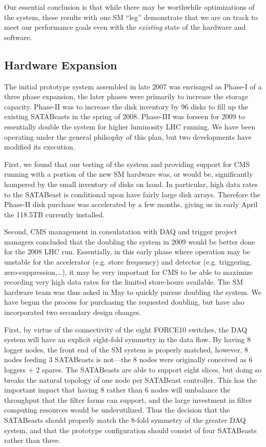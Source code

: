 Our essential conclusion is that while there may be worthwhile optimizations 
of the system, these results with one SM ``leg'' demonstrate that we are on track
to meet our performance goals even with the {\it existing}
state of the hardware and software.


\subsection{Hardware Expansion\label{sec:SMexpansion}}

The initial prototype system assembled in late 2007 was envisaged as Phase-I 
of a three phase expansion, the later phases were primarily to increase the
storage capacity.
Phase-II was to increase the disk inventory by 96 disks to fill up the existing
SATABeasts in the spring of 2008.
Phase-III was forseen for 2009 to essentially double the system for higher 
luminosity LHC running.
We have been operating under the general philsophy of this plan, 
but two developments have modified its execution.

First, we found that our testing of the system and providing support for CMS
running with a portion of the new SM hardware was, or would be, significantly hampered 
by the small inventory of disks on hand.
In particular, high data rates to the SATABeast is conditional upon have
fairly large disk arrays.
Therefore the Phase-II disk purchase was accelerated by a few months,
giving us in early April the 118.5TB currently installed.

Second, CMS management in consulatation with DAQ and trigger
project managers concluded that the doubling the system in 2009 would be
better done  for the 2008 LHC run.
Essentially, in this early phase where operation may be unstable 
for the accelerator (e.g. store frequency)
and detector (e.g. triggering, zero-suppression,\ldots), 
it may be very important for CMS to be able to maximize  recording very high data rates
for the limited store-hours available.
The SM hardware team  was thus asked in May to quickly pursue doubling the system.
We have begun the process for purchasing the requested doubling, 
but have also incorporated two secondary design changes.

First, by virtue of the connectivity of the eight FORCE10 switches, the DAQ system
will have an explicit eight-fold symmetry in the data flow.
By having 8 logger nodes, the front end of the SM system is properly matched,
however, 8 nodes feeding 3 SATABeasts is not---the 8 nodes were originally 
conceived as 6 loggers $+$ 2 spares.
The SATABeasts are able to support eight slices,
but doing so breaks the natural topology of one node per  SATABeast controller.
This has the important impact that having 8 rather than 6 nodes will umbalance 
the throughput that the filter farms 
can support, and  the large investment in filter computing resources would be underutilized.
Thus the decision that the  SATABeasts should properly match the 8-fold symmetry
of the greater DAQ system, and that the prototype  configuration should consist
of four  SATABeasts rather than three.

